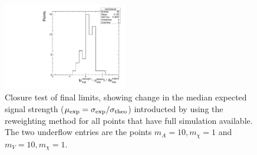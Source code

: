  \begin{figure}[htbp]
   \begin{center}
	\includegraphics[width=0.48\textwidth]{figures/interpolation_appendix/reweightClosure_deltaMu.pdf}
     \caption{Closure test of final limits, showing change in the median expected signal strength ($\mu_{\rm exp} = \sigma_{\rm exp}/\sigma_{\rm theo}$) introducted by using the reweighting method for all points that have full simulation available.  The two underflow entries are the points $m_{A}=10, m_{\chi}=1$ and $m_{V}=10, m_{\chi}=1$. }
     \label{fig:app_interp_mu_pulls}
   \end{center}
 \end{figure}



